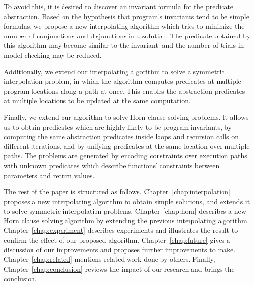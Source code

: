 To avoid this, it is desired to discover an invariant formula for the
predicate abstraction.  Based on the hypothesis that program's
invariants tend to be simple formulas, we propose a new interpolating
algorithm which tries to minimize the number of conjunctions and
disjunctions in a solution.  The predicate obtained by this algorithm
may become similar to the invariant, and the number of trials in model
checking may be reduced.

Additionally, we extend our interpolating algorithm to solve a
symmetric interpolation problem, in which the algorithm computes
predicates at multiple program locations along a path at once.  This
enables the abstraction predicates at multiple locations to be updated
at the same computation.

Finally, we extend our algorithm to solve Horn clause solving
problems.  It allows us to obtain predicates which are highly likely
to be program invariants, by computing the same abstraction predicates
inside loops and recursion calls on different iterations, and by
unifying predicates at the same location over multiple paths.  The
problems are generated by encoding constraints over execution paths
with unknown predicates which describe functions' constraints between
parameters and return values.

The rest of the paper is structured as follows.
Chapter~\ref{chap:interpolation} proposes a new interpolating
algorithm to obtain simple solutions, and extends it to solve
symmetric interpolation problems.  Chapter~\ref{chap:horn} describes a
new Horn clause solving algorithm by extending the previous
interpolating algorithm.  Chapter~\ref{chap:experiment} describes
experiments and illustrates the result to confirm the effect of our
proposed algorithm.  Chapter~\ref{chap:future} gives a discussion of
our improvements and proposes further improvements to make.
Chapter~\ref{chap:related} mentions related work done by others.
Finally, Chapter~\ref{chap:conclusion} reviews the impact of our
research and brings the conclusion.
